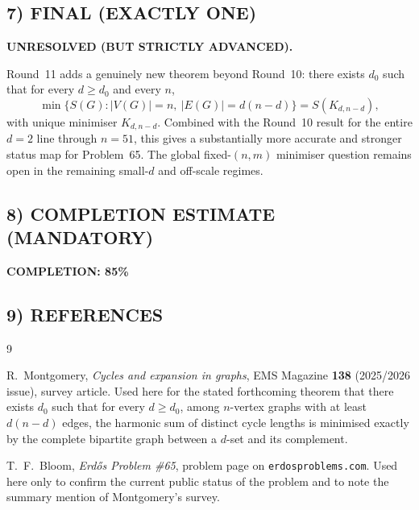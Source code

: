\subsection*{7) FINAL (EXACTLY ONE)}

\textbf{UNRESOLVED (BUT STRICTLY ADVANCED).}

Round~11 adds a genuinely new theorem beyond Round~10:
there exists $d_0$ such that for every $d\ge d_0$ and every $n$,
\[
\min\{S(G): |V(G)|=n,\ |E(G)|=d(n-d)\}=S(K_{d,n-d}),
\]
with unique minimiser $K_{d,n-d}$.
Combined with the Round~10 result for the entire $d=2$ line through $n=51$, this gives a substantially more accurate and stronger status map for Problem~65.
The global fixed-$(n,m)$ minimiser question remains open in the remaining small-$d$ and off-scale regimes.

\subsection*{8) COMPLETION ESTIMATE (MANDATORY)}

\textbf{COMPLETION: 85\%}

\subsection*{9) REFERENCES}

\begin{thebibliography}{9}

R.~Montgomery,
\emph{Cycles and expansion in graphs},
EMS Magazine \textbf{138} (2025/2026 issue), survey article.
Used here for the stated forthcoming theorem that there exists $d_0$ such that for every $d\ge d_0$, among $n$-vertex graphs with at least $d(n-d)$ edges, the harmonic sum of distinct cycle lengths is minimised exactly by the complete bipartite graph between a $d$-set and its complement.

T.~F.~Bloom,
\emph{Erd\H{o}s Problem \#65},
problem page on \texttt{erdosproblems.com}.
Used here only to confirm the current public status of the problem and to note the summary mention of Montgomery's survey.

\end{thebibliography}

